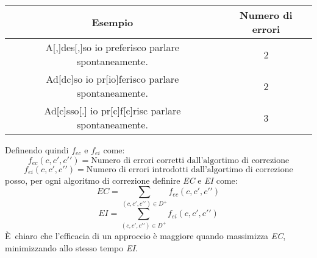 \documentclass[12pt]{article}
\newcommand{\E}{È}
\begin{document}
\begin{table}[h!]
\centering
\begin{tabular}{cc}

\textbf{Esempio} & \textbf{Numero di errori}\\
\hline
A[,]des[,]so io preferisco parlare spontaneamente. & 2 \\
Ad[dc]so io pr[io]ferisco parlare spontaneamente. & 2 \\
Ad[c]sso[.] io pr[c]f[c]risc parlare spontaneamente. & 3\\
\end{tabular}
\end{table}

\noindent
Definendo quindi $f_{ec}$ e $f_{ei}$ come:
\begin{equation}
	f_{ec}(c,c\prime,c\prime\prime) = \text{Numero di errori corretti dall'algortimo di correzione}
\end{equation}
\begin{equation}
	f_{ei}(c,c\prime,c\prime\prime) = \text{Numero di errori introdotti dall'algortimo di correzione}
\end{equation}
posso, per ogni algoritmo di correzione definire \textit{EC} e \textit{EI} come:
\begin{equation}
	EC = \sum_{(c,c\prime,c\prime\prime)\in D^+}f_{ec}(c,c\prime,c\prime\prime)
\end{equation}
\begin{equation}
	EI = \sum_{(c,c\prime,c\prime\prime)\in D^+}f_{ei}(c,c\prime,c\prime\prime)
\end{equation}
\E\ chiaro che l'efficacia di un approccio è maggiore quando massimizza \textit{EC}, minimizzando allo stesso tempo \textit{EI}.



\end{document}
